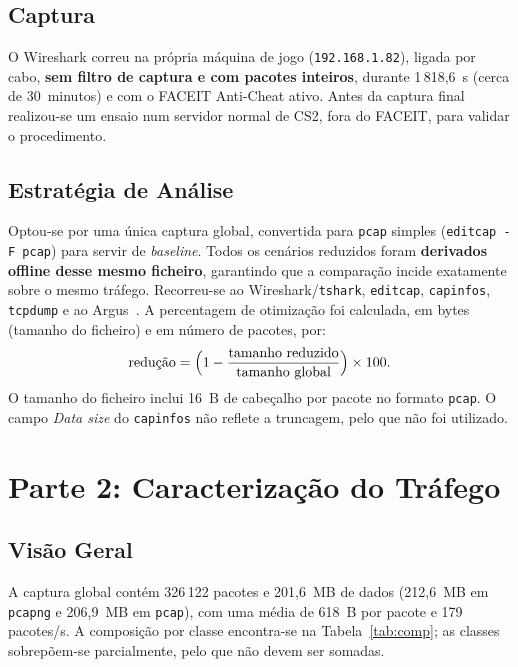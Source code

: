 \documentclass[11pt,a4paper]{article}
\begin{document}
\subsection{Captura}
O Wireshark correu na própria máquina de jogo (\texttt{192.168.1.82}), ligada por cabo, \textbf{sem filtro de captura e com
pacotes inteiros}, durante 1\,818,6~s (cerca de 30~minutos) e com o FACEIT Anti-Cheat ativo. Antes da captura final realizou-se
um ensaio num servidor normal de CS2, fora do FACEIT, para validar o procedimento.

\subsection{Estratégia de Análise}
Optou-se por uma única captura global, convertida para \texttt{pcap} simples (\texttt{editcap -F pcap}) para servir de
\emph{baseline}. Todos os cenários reduzidos foram \textbf{derivados offline desse mesmo ficheiro}, garantindo que a comparação
incide exatamente sobre o mesmo tráfego. Recorreu-se ao Wireshark/\texttt{tshark}, \texttt{editcap}, \texttt{capinfos},
\texttt{tcpdump} e ao Argus~\cite{argus}. A percentagem de otimização foi calculada, em bytes (tamanho do ficheiro) e em número
de pacotes, por:
\[
  \text{redução} = \Bigl(1 - \frac{\text{tamanho reduzido}}{\text{tamanho global}}\Bigr)\times 100 .
\]
O tamanho do ficheiro inclui 16~B de cabeçalho por pacote no formato \texttt{pcap}. O campo \emph{Data size} do \texttt{capinfos}
não reflete a truncagem, pelo que não foi utilizado.

\section{Parte 2: Caracterização do Tráfego}

\subsection{Visão Geral}
A captura global contém 326\,122 pacotes e 201,6~MB de dados (212,6~MB em \texttt{pcapng} e 206,9~MB em \texttt{pcap}), com uma
média de 618~B por pacote e 179 pacotes/s. A composição por classe encontra-se na Tabela~\ref{tab:comp}; as classes
sobrepõem-se parcialmente, pelo que não devem ser somadas.
\end{document}
